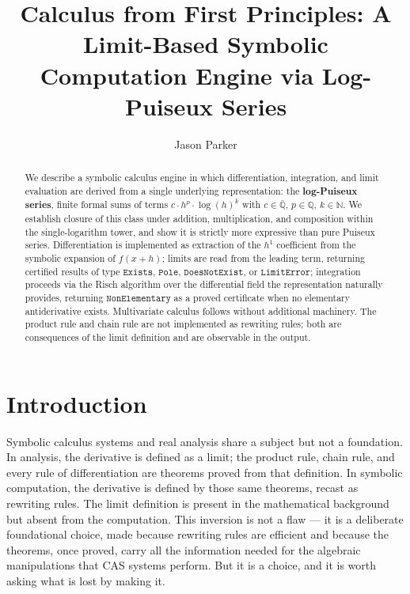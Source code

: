 \documentclass[12pt]{article}
\begin{document}
\title{Calculus from First Principles: A Limit-Based Symbolic Computation Engine via Log-Puiseux Series}
\author{Jason Parker}
\date{}

\maketitle
\thispagestyle{fancy}

\begin{abstract}
\noindent We describe a symbolic calculus engine in which differentiation,
integration, and limit evaluation are derived from a single underlying
representation: the \textbf{log-Puiseux series}, finite formal sums of
terms \(c \cdot h^p \cdot \log(h)^k\) with \(c \in \bar{\mathbb{Q}}\),
\(p \in \mathbb{Q}\), \(k \in \mathbb{N}\). We establish closure of this
class under addition, multiplication, and composition within the
single-logarithm tower, and show it is strictly more expressive than
pure Puiseux series. Differentiation is implemented as extraction of the
\(h^1\) coefficient from the symbolic expansion of \(f(x+h)\); limits
are read from the leading term, returning certified results of type
\(\mathtt{Exists}\), \(\mathtt{Pole}\), \(\mathtt{DoesNotExist}\), or
\(\mathtt{LimitError}\); integration proceeds via the Risch algorithm
over the differential field the representation naturally provides,
returning \(\mathtt{NonElementary}\) as a proved certificate when no
elementary antiderivative exists. Multivariate calculus follows without
additional machinery. The product rule and chain rule are not
implemented as rewriting rules; both are consequences of the limit
definition and are observable in the output.
\end{abstract}


\section{Introduction}\label{introduction}

Symbolic calculus systems and real analysis share a subject but not a
foundation. In analysis, the derivative is defined as a limit; the
product rule, chain rule, and every rule of differentiation are theorems
proved from that definition. In symbolic computation, the derivative is
defined by those same theorems, recast as rewriting rules. The limit
definition is present in the mathematical background but absent from the
computation. This inversion is not a flaw --- it is a deliberate
foundational choice, made because rewriting rules are efficient and
because the theorems, once proved, carry all the information needed for
the algebraic manipulations that CAS systems perform. But it is a
choice, and it is worth asking what is lost by making it.
\end{document}
